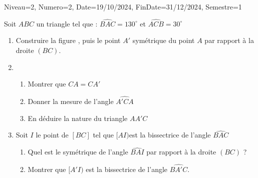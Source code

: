 \documentclass[a4paper,12pt]{article}
\begin{document}
\begin{Maquette}[DM]{Niveau=2, Numero=2, Date=19/10/2024, FinDate=31/12/2024, Semestre=1}
\begin{exercice}
Soit $ABC$ un triangle tel que : $\widehat{BAC}=130^{\circ}$ et $\widehat{ACB}=30^{\circ}$
\begin{enumerate}
\item Construire la figure , puis le point $A'$ symétrique du point $A$ par rapport à la droite $(BC)$.
\item
	\begin{enumerate}
	\item Montrer que $CA=CA'$
	\item Donner la mesure de l'angle $\widehat{A'CA}$
	\item En déduire la nature du triangle $AA'C$
	\end{enumerate}
\item Soit $I$ le point de $[BC]$ tel que $[AI)$est  la bissectrice de l'angle $\widehat{BAC}$
		\begin{enumerate}
		\item Quel est le symétrique de l'angle $\widehat{BAI}$ par rapport à la droite $(BC)$ ?
		\item Montrer que $[A'I)$ est la bissectrice de l'angle $\widehat{BA'C}$.
		\end{enumerate}	
\end{enumerate}
\end{exercice}

\end{Maquette}
\end{document}
